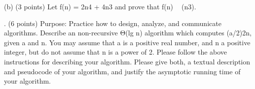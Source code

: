 \documentclass[12pt]{article}
\newenvironment{question}[2][Question]{\begin{trivlist}
		\item[\hskip \labelsep {\bfseries #1}\hskip \labelsep {\bfseries #2.}]}{\end{trivlist}}
\begin{document}
\begin{question}{5b}	
		(b) (3 points) Let f(n) = 2n4 + 4n3 and prove that f(n)  (n3).
			\end{question}
	
\begin{question}{6}	
		6. (6 points) Purpose: Practice how to design, analyze, and communicate algorithms. Describe an non-recursive Θ(lg n) algorithm which computes (a/2)2n, given a and n. You may assume that a is a positive real number, and n a positive integer, but do not assume that n is a power of 2. Please follow the above instructions for describing your algorithm. Please give both, a textual description and pseudocode of your algorithm, and justify the asymptotic running time of your algorithm.
		
		
	\end{question}
	
	\clearpage
	
	
	
\end{document}
